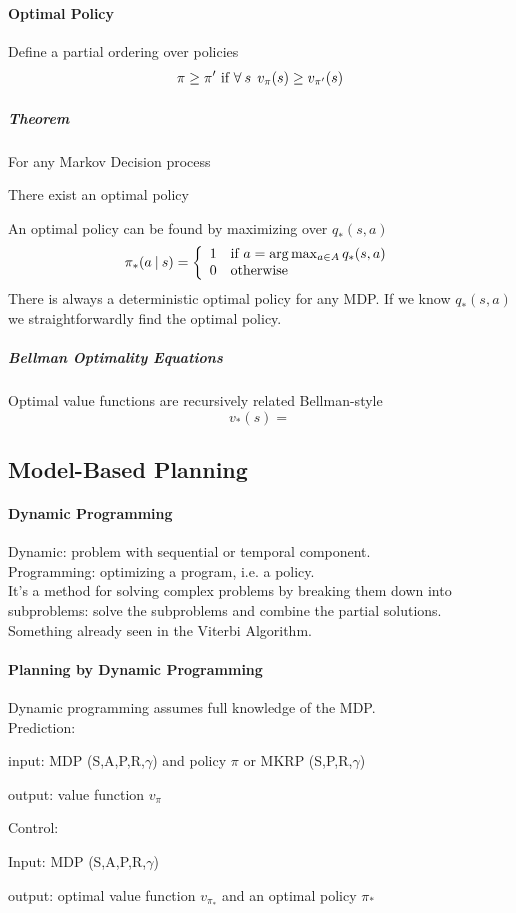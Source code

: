 \documentclass[10pt]{report}
\begin{document}
\paragraph{Optimal Policy} Define a partial ordering over policies $$\pi\geq \pi'\hbox{ if }\forall\:s\:\:v_\pi(s)\geq v_{\pi'}(s)$$
\subparagraph{Theorem} For any Markov Decision process\begin{list}{}{}
	\item There exist an optimal policy %
\end{list}
An optimal policy can be found by maximizing over $q_*(s,a)$
$$\pi_*(a\:|\:s)=\left\{\begin{array}{l l}
1&\hbox{if }a=\arg\max_{a\in A} q_*(s,a)\\
0&\hbox{otherwise}
\end{array}\right.$$
There is always a deterministic optimal policy for any MDP. If we know $q_*(s,a)$ we straightforwardly find the optimal policy.
\subparagraph{Bellman Optimality Equations} Optimal value functions are recursively related Bellman-style
$$v_*(s)=$$ %
\subsection{Model-Based Planning}
\paragraph{Dynamic Programming} Dynamic: problem with sequential or temporal component.\\
Programming: optimizing a program, i.e. a policy.\\
It's a method for solving complex problems by breaking them down into subproblems: solve the subproblems and combine the partial solutions.\\
Something already seen in the Viterbi Algorithm.
\paragraph{Planning by Dynamic Programming} Dynamic programming assumes full knowledge of the MDP.\\
Prediction:\begin{list}{}{}
	\item input: MDP (S,A,P,R,$\gamma$) and policy $\pi$ or MKRP (S,P,R,$\gamma$)
	\item output: value function $v_\pi$
\end{list}
Control:
\begin{list}{}{}
	\item Input: MDP (S,A,P,R,$\gamma$)
	\item output: optimal value function $v_{\pi_*}$ and an optimal policy $\pi_*$
\end{list}
\end{document}
